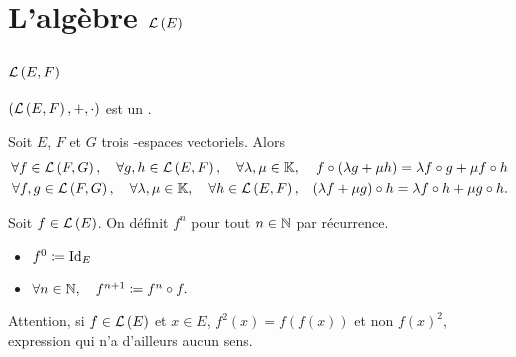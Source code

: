 \documentclass{magnoliaold}
\begin{document}
\section{L'algèbre $\mathcal{L}\left(E\right)$}

\subsection{$\mathcal{L}\left(E,F\right)$}

\begin{proposition}[utile=-3]
$\left(\mathcal{L}\left(E,F\right),+,\cdot\right)$ est un \Kev.
\end{proposition}

\begin{proposition}
Soit $E$, $F$ et $G$ trois \K-espaces vectoriels. Alors
\begin{eqnarray*}
\forall f\in\mathcal{L}\left(F,G\right),\quad \forall g,h\in\mathcal{L}\left(E,F\right),\quad \forall \lambda,\mu\in\mathbb{K},& &
f\circ\left(\lambda g+\mu h\right)=\lambda f\circ g+\mu f\circ h\\
\forall f,g\in\mathcal{L}\left(F,G\right),\quad \forall \lambda,\mu\in\mathbb{K} ,\quad \forall h\in\mathcal{L}\left(E,F\right),& &
\left(\lambda f+\mu g\right)\circ h=\lambda f\circ h+\mu g\circ h.
\end{eqnarray*}
\end{proposition}


\begin{definition}
Soit $f\in\mathcal{L}\left(E\right)$. On définit $f^n$ pour tout $n\in\mathbb{N}$ par récurrence.
\begin{itemize}
\item $f^0\coloneqq{\rm Id}_E$
\item $\forall n\in\mathbb{N},\quad f^{n+1}\coloneqq f^n\circ f.$
\end{itemize}
\end{definition}

\begin{remarqueUnique}
\remarque Attention, si $f\in\mathcal{L}\left(E\right)$ et $x\in E$, $f^2(x)=f(f(x))$ et non $f(x)^2$, expression qui n'a
  d'ailleurs aucun sens.
\end{remarqueUnique}
\end{document}

